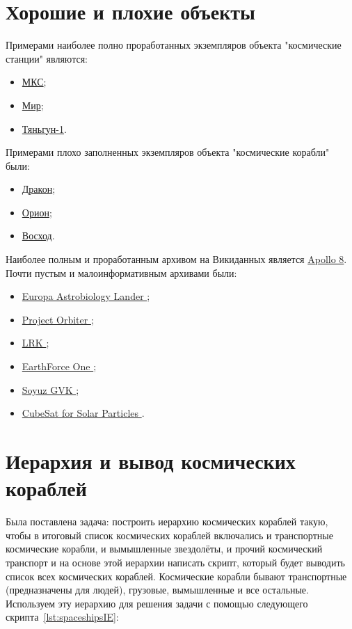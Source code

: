 \section{Хорошие и плохие объекты}
Примерами наиболее полно проработанных экземпляров объекта "космические станции" являются:
\begin{itemize}
  \item\href{https://www.wikidata.org/wiki/Q25271}{МКС};
  \item\href{https://www.wikidata.org/wiki/Q48604}{Мир};
  \item\href{https://www.wikidata.org/wiki/Q131500}{Тяньгун-1}.
\end{itemize}
Примерами плохо заполненных экземпляров объекта "космические корабли" были:
\begin{itemize}
  \item\href{https://www.wikidata.org/wiki/Q236448}{Дракон};
  \item\href{https://www.wikidata.org/wiki/Q211727}{Орион};
  \item\href{https://www.wikidata.org/wiki/Q841176}{Восход}.
\end{itemize}
Наиболее полным и проработанным архивом на Викиданных является \href{ https://www.wikidata.org/wiki/Q184201}{Apollo 8}.
Почти пустым и малоинформативным архивами были: 
\begin{itemize}
  \item\href{https://www.wikidata.org/wiki/Q10491365}{ Europa Astrobiology Lander };
  \item\href{https://www.wikidata.org/wiki/Q6514453 }{ Project Orbiter };
  \item\href{https://www.wikidata.org/wiki/Q5961734 }{ LRK };
  \item\href{https://www.wikidata.org/wiki/Q5327028 }{ EarthForce One };
  \item\href{https://www.wikidata.org/wiki/Q60767924 }{ Soyuz GVK };
  \item\href{https://www.wikidata.org/wiki/Q22907583 }{ CubeSat for Solar Particles }.
\end{itemize}

\section{Иерархия и вывод космических кораблей}
Была поставлена задача: построить иерархию космических кораблей такую, чтобы в итоговый список космических кораблей включались и транспортные космические корабли, и вымышленные звездолёты, и прочий космический транспорт и на основе этой иерархии написать скрипт, который будет выводить список всех космических кораблей. Космические корабли бывают транспортные (предназначены для людей), грузовые, вымышленные и все остальные. Используем эту иерархию для решения задачи с помощью следующего скрипта~\ref{lst:spaceshipsIE}:

